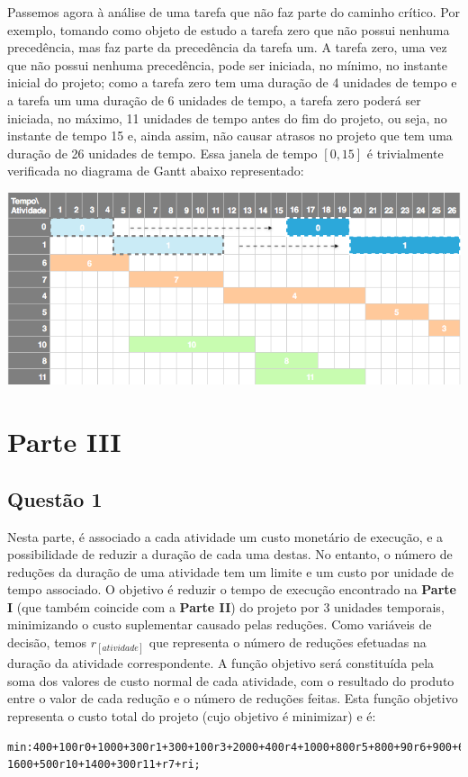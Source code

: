 \documentclass[11pt,titlepage,contentspage,a4paper]{article} %
\begin{document}
Passemos agora à análise de uma tarefa que não faz parte do caminho crítico. Por exemplo, tomando como objeto de estudo a tarefa zero que não possui nenhuma precedência, mas faz parte da precedência da tarefa um.
A tarefa zero, uma vez que não possui nenhuma precedência, pode ser iniciada, no mínimo, no instante inicial do projeto; como a tarefa zero tem uma duração de 4 unidades de tempo e a tarefa um uma duração de 6 unidades de tempo, a tarefa zero poderá ser iniciada, no máximo, 11 unidades de tempo antes do fim do projeto, ou seja, no instante de tempo 15 e, ainda assim, não causar atrasos no projeto que tem uma duração de 26 unidades de tempo.
Essa janela de tempo $[0,15]$ é trivialmente verificada no diagrama de Gantt abaixo representado: 
\begin{center}
\includegraphics[width=\textwidth]{gant4}
\end{center}

\section{Parte III}
\subsection{Questão 1}

Nesta parte, é associado a cada atividade um custo monetário de execução, e a possibilidade de reduzir a duração de cada uma destas.
No entanto, o número de reduções da duração de uma atividade tem um limite e um custo por unidade de tempo associado. O objetivo é reduzir o tempo de execução encontrado na \textbf{Parte I} (que também coincide com a \textbf{Parte II}) do projeto por 3 unidades temporais, minimizando o custo suplementar causado pelas reduções.
Como variáveis de decisão, temos $r_{[atividade]}$ que representa o número de reduções efetuadas na duração da atividade correspondente.
A função objetivo será constituída pela soma dos valores de custo normal de cada atividade, com o resultado do produto entre o valor de cada redução e o número de reduções feitas. Esta função objetivo representa o custo total do projeto (cujo objetivo é minimizar) e é:
\begin{Verbatim}[frame=single]
min:400+100r0+1000+300r1+300+100r3+2000+400r4+1000+800r5+800+90r6+900+600+100r8+
1600+500r10+1400+300r11+r7+ri;
\end{Verbatim}
\end{document}
